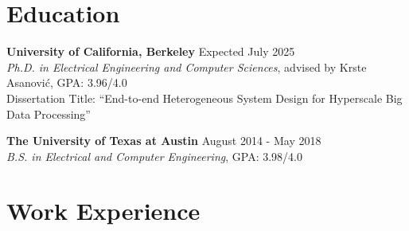 \documentclass[line]{res}
\begin{document}
\address{\href{https://abejgonzalez.github.io}{https://abejgonzalez.github.io} $|$ \href{mailto:abe.gonzalez@berkeley.edu}{abe.gonzalez@berkeley.edu}}

\begin{resume}

\vspace{-8mm}

\section{\Large{Education}}
\label{sec:education}
\vspace{1mm}

\textbf{University of California, Berkeley} \hfill Expected July 2025
\\
\textit{Ph.D. in Electrical Engineering and Computer Sciences}, advised by Krste Asanovi\'c, GPA: 3.96/4.0
\\
Dissertation Title: ``End-to-end Heterogeneous System Design for Hyperscale Big Data Processing''

\vspace{-3mm}

\textbf{The University of Texas at Austin} \hfill August 2014 - May 2018
\\
\textit{B.S. in Electrical and Computer Engineering}, GPA: 3.98/4.0

\vspace{-3mm}

\section{\Large{Work Experience}}
\label{sec:jobs}
\vspace{1mm}


\end{resume}
\end{document}
